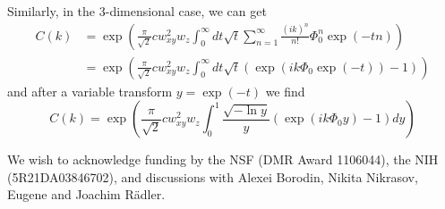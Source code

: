 \documentclass[%
 reprint,
 amsmath,amssymb,
 aps,
]{revtex4-1}
\begin{document}
Similarly, in the 3-dimensional case, we can get
\begin{equation}
	\begin{aligned}
	C(k) &= \exp\left(\frac{\pi}{\sqrt{2}}cw_{xy}^{2}w_{z}\int_{0}^{\infty}dt\sqrt{t}\sum_{n=1}^{\infty}\frac{(ik)^{n}}{n!}\Phi_{0}^{n}\exp(-tn)\right)\\
	&= \exp\left(\frac{\pi}{\sqrt{2}}cw_{xy}^{2}w_{z}\int_{0}^{\infty}dt\sqrt{t}(\exp(ik\Phi_{0}\exp(-t))-1) \right)
	\end{aligned}
\end{equation}
and after a variable transform $y=\exp(-t)$ we find
\begin{equation}
	C(k) = \exp\left(\frac{\pi}{\sqrt{2}}cw_{xy}^{2}w_{z}\int_{0}^{1}\frac{\sqrt{-\ln{y}}}{y}(\exp(ik\Phi_{0}y)-1)dy \right)
\end{equation}

\begin{acknowledgments}
We wish to acknowledge funding by the NSF (DMR Award
1106044), the NIH (5R21DA03846702), and discussions with Alexei Borodin, Nikita Nikrasov, Eugene and Joachim R\"adler.
\end{acknowledgments}
\end{document}
